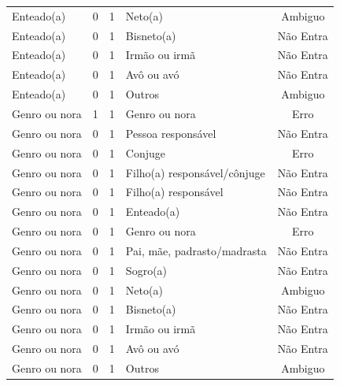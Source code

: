 \documentclass[
	12pt,				%
	openright,			%
	twoside,			%
	a4paper,			%
	english,			%
	french,				%
	spanish,			%
	brazil				%
	]{abntex2}
\begin{document}
\begin{anexosenv}
\begin{longtable}{@{}lcclc@{}}
Enteado(a)                   & 0         & 1        & Neto(a)                      & Ambiguo         \\
Enteado(a)                   & 0         & 1        & Bisneto(a)                   & Não Entra       \\
Enteado(a)                   & 0         & 1        & Irmão ou irmã                & Não Entra       \\
Enteado(a)                   & 0         & 1        & Avô ou avó                   & Não Entra       \\
Enteado(a)                   & 0         & 1        & Outros                       & Ambiguo         \\
Genro ou nora                & 1         & 1        & Genro ou nora                & Erro            \\
Genro ou nora                & 0         & 1        & Pessoa responsável           & Não Entra       \\
Genro ou nora                & 0         & 1        & Conjuge                      & Erro            \\
Genro ou nora                & 0         & 1        & Filho(a) responsável/cônjuge & Não Entra       \\
Genro ou nora                & 0         & 1        & Filho(a) responsável         & Não Entra       \\
Genro ou nora                & 0         & 1        & Enteado(a)                   & Não Entra       \\
Genro ou nora                & 0         & 1        & Genro ou nora                & Erro            \\
Genro ou nora                & 0         & 1        & Pai, mãe, padrasto/madrasta  & Não Entra       \\
Genro ou nora                & 0         & 1        & Sogro(a)                     & Não Entra       \\
Genro ou nora                & 0         & 1        & Neto(a)                      & Ambiguo         \\
Genro ou nora                & 0         & 1        & Bisneto(a)                   & Não Entra       \\
Genro ou nora                & 0         & 1        & Irmão ou irmã                & Não Entra       \\
Genro ou nora                & 0         & 1        & Avô ou avó                   & Não Entra       \\
Genro ou nora                & 0         & 1        & Outros                       & Ambiguo         \\

\end{longtable}
\end{anexosenv}
\end{document}
